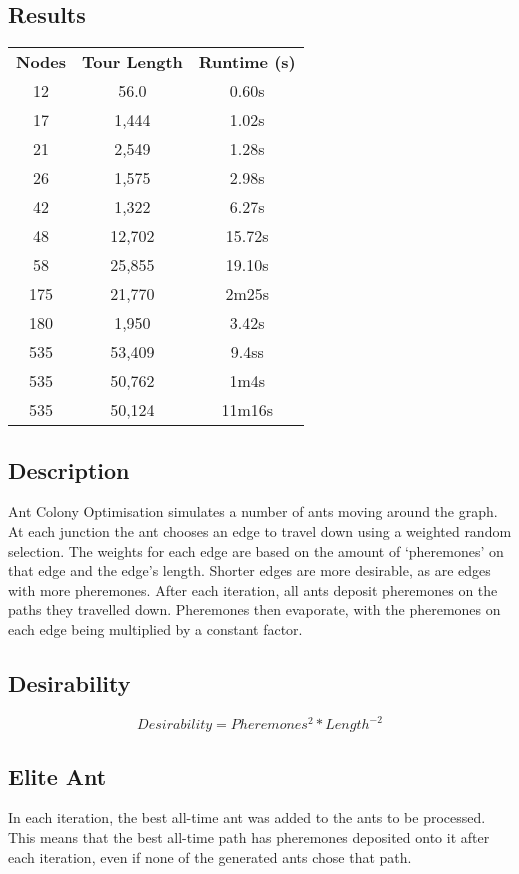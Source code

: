 \documentclass[a4paper, 11pt,table]{article}
\begin{document}
		\subsection{Results}
	\label{useCase:antResults}
	\begin{center}
		\begin{tabu}{|c c c|}
			\textbf{Nodes} & \textbf{Tour Length} & \textbf{Runtime (s)}\\
			12 & 56.0 & 0.60s \\
			17 & 1,444 & 1.02s\\
			21 & 2,549 & 1.28s\\
			26 & 1,575 & 2.98s\\
			42 & 1,322 & 6.27s\\
			48 & 12,702 & 15.72s\\
			58 & 25,855 & 19.10s\\
			175 &  21,770 & 2m25s\\
			180 & 1,950 & 3.42s\\
			535 & 53,409 & 9.4ss\\
			535 & 50,762 & 1m4s\\
			535 & 50,124 & 11m16s\\
		\end{tabu}
	\end{center}

\subsection{Description}
Ant Colony Optimisation simulates a number of ants moving around the graph. At each junction the ant chooses an edge to travel down using a weighted random selection. The weights for each edge are based on the amount of `pheremones' on that edge and the edge's length. Shorter edges are more desirable, as are edges with more pheremones. After each iteration, all ants deposit pheremones on the paths they travelled down. Pheremones then evaporate, with the pheremones on each edge being multiplied by a constant factor.

\subsection{Desirability}
\begin{equation}
Desirability = Pheremones^{2}*Length^{-2}
\end{equation}

\subsection{Elite Ant}
In each iteration, the best all-time ant was added to the ants to be processed. This means that the best all-time path has pheremones deposited onto it after each iteration, even if none of the generated ants chose that path.
\end{document}
